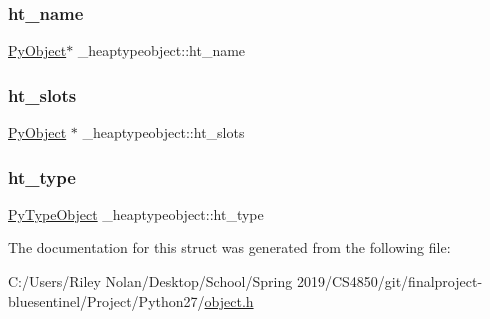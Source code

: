 \subsubsection{\texorpdfstring{ht\_name}{ht\_name}}
{\footnotesize\ttfamily \mbox{\hyperlink{_python27_2object_8h_aadc84ac7aed2cfa6f20c25f62bf3dac7}{Py\+Object}}$\ast$ \+\_\+heaptypeobject\+::ht\+\_\+name}

\mbox{\label{struct__heaptypeobject_a576c6533321ab6cb92b6d114d1a5c641}} 
\subsubsection{\texorpdfstring{ht\_slots}{ht\_slots}}
{\footnotesize\ttfamily \mbox{\hyperlink{_python27_2object_8h_aadc84ac7aed2cfa6f20c25f62bf3dac7}{Py\+Object}} $\ast$ \+\_\+heaptypeobject\+::ht\+\_\+slots}

\mbox{\label{struct__heaptypeobject_a757f1d6b7f668a05fc6fc641b7a41338}} 
\subsubsection{\texorpdfstring{ht\_type}{ht\_type}}
{\footnotesize\ttfamily \mbox{\hyperlink{_python27_2object_8h_a42a55dd6e973872c7a6bc61632070f6f}{Py\+Type\+Object}} \+\_\+heaptypeobject\+::ht\+\_\+type}



The documentation for this struct was generated from the following file\+:\begin{DoxyCompactItemize}
\item 
C\+:/\+Users/\+Riley Nolan/\+Desktop/\+School/\+Spring 2019/\+C\+S4850/git/finalproject-\/bluesentinel/\+Project/\+Python27/\mbox{\hyperlink{_python27_2object_8h}{object.\+h}}\end{DoxyCompactItemize}
